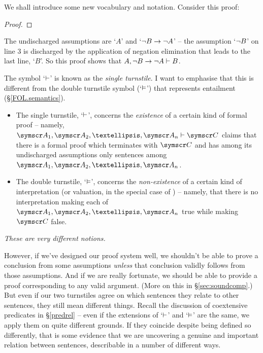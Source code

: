 We shall introduce some new vocabulary and notation.
 Consider this proof: \begin{proof}
	\open
	\open
	\close
\end{proof} The undischarged assumptions are `$A$' and `$\neg B \rightarrow \neg A$' – the assumption `$\neg B$' on line 3 is discharged by the application of negation elimination that leads to the last line, `$B$'. So this proof shows that $A, \neg B \rightarrow \neg A \vdash B$.

The symbol `$\vdash$' is known as the \emph{single turnstile}. I want to emphasise that this is different from the {double turnstile} symbol (`$\vDash$') that represents entailment (§\ref{FOL.semantics}). \begin{itemize}
	\item The single turnstile, `$\vdash$', concerns the \emph{existence} of a certain kind of formal proof – namely, $\meta{A}_{1}, \meta{A}_{2}, …, \meta{A}_{n} \proves \meta{C}$ claims that there is a formal proof which terminates with $\meta{C}$ and has among its undischarged assumptions only sentences among $\meta{A}_{1}, \meta{A}_{2}, …, \meta{A}_{n}$.
	\item The double turnstile, `$\vDash$', concerns the \emph{non-existence} of a certain kind of interpretation (or valuation, in the special case of \TFL) – namely, that there is no interpretation making each of $\meta{A}_{1}, \meta{A}_{2}, …, \meta{A}_{n}$ true while making $\meta{C}$ false.
\end{itemize} \emph{These are very different notions.}

However, if we've designed our proof system well, we shouldn't be able to prove a conclusion from some assumptions \emph{unless} that conclusion validly follows from those assumptions. And if we are really fortunate, we should be able to provide a proof corresponding to any valid argument. (More on this in §\ref{sec:soundcomp}.) But even if our two turnstiles agree on which sentences they relate to other sentences, they still mean different things. Recall the discussion of coextensive predicates in §\ref{predrel} – even if the extensions of `$\vdash$' and `$\vDash$' are the same, we apply them on quite different grounds. If they coincide despite being defined so differently, that is some evidence that we are uncovering a genuine and important relation between sentences, describable in a number of different ways.

